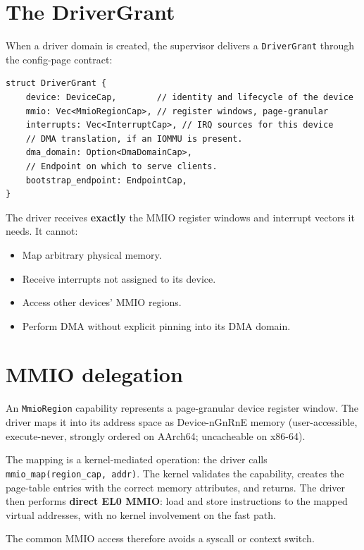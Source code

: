 \section{The DriverGrant}

When a driver domain is created, the supervisor delivers a \texttt{DriverGrant}
through the config-page contract:

\begin{lstlisting}[style=rustCode]
struct DriverGrant {
    device: DeviceCap,        // identity and lifecycle of the device
    mmio: Vec<MmioRegionCap>, // register windows, page-granular
    interrupts: Vec<InterruptCap>, // IRQ sources for this device
    // DMA translation, if an IOMMU is present.
    dma_domain: Option<DmaDomainCap>,
    // Endpoint on which to serve clients.
    bootstrap_endpoint: EndpointCap,
}
\end{lstlisting}

The driver receives \textbf{exactly} the MMIO register windows and interrupt
vectors it needs. It cannot:
\begin{itemize}
    \item Map arbitrary physical memory.
    \item Receive interrupts not assigned to its device.
    \item Access other devices' MMIO regions.
    \item Perform DMA without explicit pinning into its DMA domain.
\end{itemize}

\section{MMIO delegation}

An \texttt{MmioRegion} capability represents a page-granular device register
window. The driver maps it into its address space as Device-nGnRnE memory
(user-accessible, execute-never, strongly ordered on AArch64; uncacheable on
x86-64).

The mapping is a kernel-mediated operation: the driver calls
\texttt{mmio\_map(region\_cap, addr)}. The kernel validates the
capability, creates the page-table entries with the correct memory attributes,
and returns. The driver then performs \textbf{direct EL0 MMIO}: load and store
instructions to the mapped virtual addresses, with no kernel involvement on the
fast path.

The common MMIO access therefore avoids a syscall or context switch.

